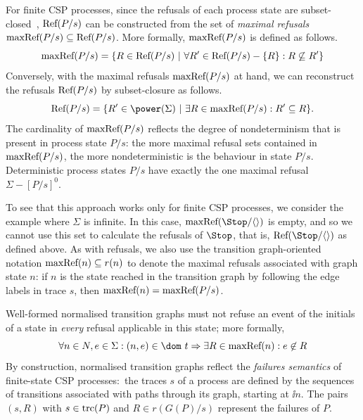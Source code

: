For finite CSP processes, since the refusals of each process state are
subset-closed~\cite{Hoare:1985:CSP:3921,Roscoe2010}, $\text{Ref}(P/s)$ can be
constructed from the set of \emph{maximal refusals}
$\text{maxRef}(P/s)\subseteq\text{Ref}(P/s)$. More formally, $\text{maxRef}(P/s)$ is defined
as follows.
%
\begin{equation}
\text{maxRef}(P/s) = \{ R \in\text{Ref}(P/s)~|~\forall R'\in \text{Ref}(P/s) - \{ R\}: R \not\subseteq R'\}
\end{equation}
%
Conversely, with the maximal refusals $\text{maxRef}(P/s)$ at hand, we can
reconstruct the refusals $\text{Ref}(P/s)$ by subset-closure as follows.
%
\begin{equation}
\refs(P/s) = \{ R'\in\power(\Sigma)~|~\exists R\in \maxrefs(P/s): R'\subseteq R \}.
\end{equation}
%
The cardinality of $\text{maxRef}(P/s)$ reflects the degree of
nondeterminism that is present in process state $P/s$: the more maximal refusal sets
contained in  $\text{maxRef}(P/s)$, the more nondeterministic is the behaviour in
state $P/s$. Deterministic process states $P/s$ have exactly the one maximal refusal
$\Sigma-[P/s]^0$.

To see that this approach works only for finite CSP processes, we consider
the example where $\Sigma$ is infinite. In this case,
$\maxrefs(\Stop/\langle\rangle)$ is empty, and so we cannot use this set to
calculate the refusals of $\Stop$, that is, $\refs(\Stop/\langle\rangle)$ as
defined above. As with refusals, we also use the transition graph-oriented
notation $\text{maxRef}(n) \subseteq r(n)$ to denote the maximal refusals
associated with graph state $n$: if $n$ is the state reached in the
transition graph by following the edge labels in trace $s$, then $\text{maxRef}(n)
= \text{maxRef}(P/s)$.

Well-formed normalised transition graphs must not refuse an event of the
initials of a state in {\it every} refusal applicable in this state; more
formally,
%
\begin{equation}
\label{eq:wellformedg}
\forall n\in N, e\in\Sigma: (n,e)\in\dom~t \Rightarrow
\exists R\in \maxrefs(n): e\not\in R
\end{equation}
%
By construction, normalised transition graphs reflect the \emph{failures
semantics} of finite-state CSP processes:~the traces $s$ of a process are
defined by the sequences of transitions associated with paths through its
graph, starting at $\ii n$. The pairs $(s,R)$ with $s\in\text{trc}(P)$ and $R\in
r(G(P)/s)$ represent the failures of $P$.

